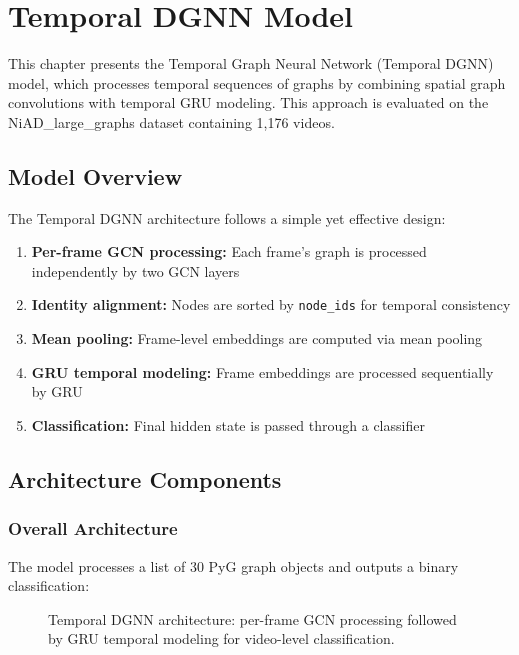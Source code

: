 
\chapter{Temporal DGNN Model}
\label{ch:model_dynamic_gnn}

This chapter presents the Temporal Graph Neural Network (Temporal DGNN) model, which processes temporal sequences of graphs by combining spatial graph convolutions with temporal GRU modeling. This approach is evaluated on the NiAD\_large\_graphs dataset containing 1,176 videos.

\section{Model Overview}

The Temporal DGNN architecture follows a simple yet effective design:

\begin{enumerate}
    \item \textbf{Per-frame GCN processing:} Each frame's graph is processed independently by two GCN layers
    \item \textbf{Identity alignment:} Nodes are sorted by \texttt{node\_ids} for temporal consistency
    \item \textbf{Mean pooling:} Frame-level embeddings are computed via mean pooling
    \item \textbf{GRU temporal modeling:} Frame embeddings are processed sequentially by GRU
    \item \textbf{Classification:} Final hidden state is passed through a classifier
\end{enumerate}

\section{Architecture Components}

\subsection{Overall Architecture}

The model processes a list of 30 PyG graph objects and outputs a binary classification:

\begin{figure}[H]
    \centering
    
    \caption{Temporal DGNN architecture: per-frame GCN processing followed by GRU temporal modeling for video-level classification.}
    \label{fig:dynamic_gnn_architecture}
\end{figure}

